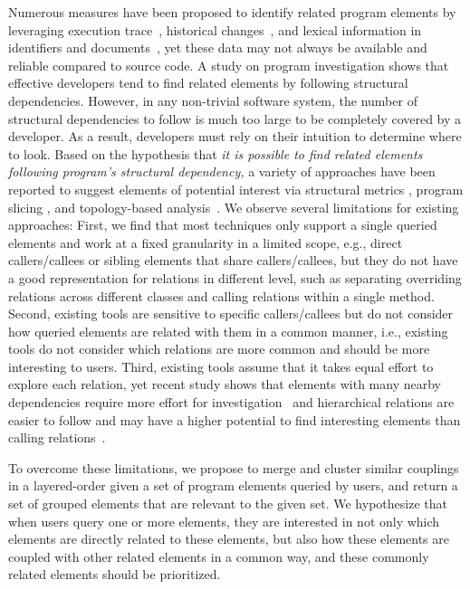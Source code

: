 \documentclass{sig-alternate}
\begin{document}
Numerous measures have been proposed to identify related program elements by leveraging execution trace~\cite{Briand:dynamicTSE04}, historical changes~\cite{Ying:cochangeTSE04, Gall:changeCouple08}, and lexical information in identifiers and documents~\cite{Denys:couple11, Hill:neighbor07}, yet these data may not always be available and reliable compared to source code. 
A study on program investigation \cite{Robillard:TSE04} shows that effective developers tend to find related elements by following structural dependencies. However, in any non-trivial software system, the number of structural dependencies to follow is much too large to be completely covered by a developer. As a result, developers must rely on their intuition to determine where to look. Based on the hypothesis that {\em it is possible to find  related elements following program's structural dependency,}  a variety of approaches have been reported to suggest elements of potential interest via structural metrics \cite{Briand:structural99}, program slicing \cite{Bodik:slicePLSI07}, and topology-based analysis~\cite{Robillard:FSE05, Zimmermann:ICSE08}.  We observe several limitations for existing approaches: First, we find that most techniques only support a single queried elements and work at a fixed granularity in a limited scope, e.g., direct callers/callees or sibling elements that share callers/callees, but they do not have a good representation for relations in different level, such as separating overriding relations across different classes and calling relations within a single method.  Second, existing tools are sensitive to specific callers/callees but do not consider how queried elements are related with them  in a common manner, i.e., existing tools do not consider which relations are more common and should be more interesting to users. Third, existing tools assume that it takes equal effort to explore each relation, yet recent study shows that elements with many nearby dependencies require more effort for investigation~\cite{Holmes:ASE09} and hierarchical relations are easier to follow and may have a higher potential to find interesting elements than calling relations~\cite{Murphy:nlConcern11}. 

To overcome these limitations, we propose to merge and cluster similar couplings in a layered-order given a set of program elements queried by users, and return a set of grouped elements that are relevant to the given set. 
We hypothesize that when users query one or more elements, they are  interested in not only which elements are directly related to these elements, but also how these elements are coupled with other related elements in a common way, and these commonly related elements should be prioritized.  
\end{document}
